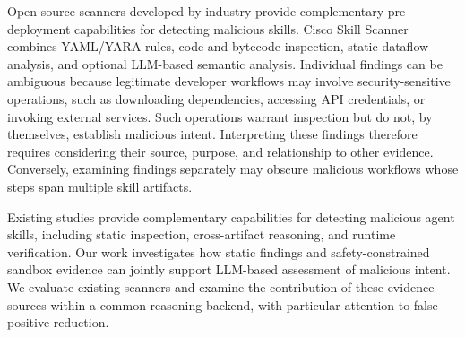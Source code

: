 Open-source scanners developed by industry provide complementary pre-deployment capabilities for detecting malicious skills. Cisco Skill Scanner~\cite{cisco_skill_scanner} combines YAML/YARA rules, code and bytecode inspection, static dataflow analysis, and optional LLM-based semantic analysis. 
Individual findings can be ambiguous because legitimate
developer workflows may involve security-sensitive operations,
such as downloading dependencies, accessing API credentials,
or invoking external services. Such operations warrant
inspection but do not, by themselves, establish malicious
intent. Interpreting these findings therefore requires
considering their source, purpose, and relationship to other
evidence. Conversely, examining findings separately may
obscure malicious workflows whose steps span multiple
skill artifacts.



\begin{tcolorbox}[colback=gray!5,colframe=gray!75!black,title=\textbf{Summary}]
Existing studies provide complementary capabilities for
detecting malicious agent skills, including static inspection,
cross-artifact reasoning, and runtime verification.
Our work investigates how static findings and
safety-constrained sandbox evidence can jointly support
LLM-based assessment of malicious intent. We evaluate
existing scanners and examine the contribution of these
evidence sources within a common reasoning backend,
with particular attention to false-positive reduction.
\end{tcolorbox}

